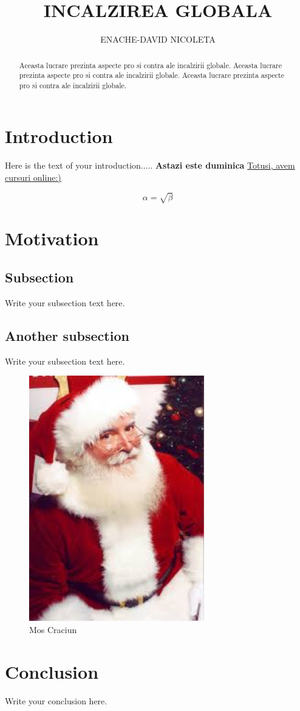\documentclass{article}
\begin{document}
\title{INCALZIREA GLOBALA}
\author{ENACHE-DAVID NICOLETA}

\maketitle

\begin{abstract}
Aceasta lucrare prezinta aspecte pro si contra ale incalzirii globale.
Aceasta lucrare prezinta aspecte pro si contra ale incalzirii globale.
Aceasta lucrare prezinta aspecte pro si contra ale incalzirii globale.
\end{abstract}

\section{Introduction}
Here is the text of your introduction.....
\textbf{Astazi este duminica}
\underline{Totusi, avem cursuri online:)}

\begin{equation}
    \label{simple_equation}
    \alpha = \sqrt{ \beta }
\end{equation}

\section{Motivation}

\subsection{Subsection}
Write your subsection text here.

\subsection{Another subsection}
Write your subsection text here.


\begin{figure}
    
    \includegraphics[width=3.0in]{mosul}
    \caption{Mos Craciun}
    \label{mosul}
\end{figure}

\section{Conclusion}
Write your conclusion here.
\end{document}
